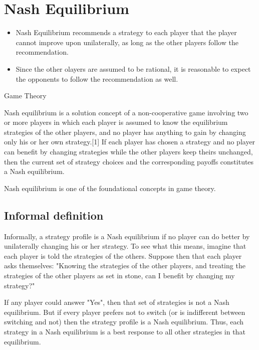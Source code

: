 \documentclass[a4paper,12pt]{article}
\begin{document}
\section{Nash Equilibrium}

\begin{framed}
\begin{itemize}
\item Nash Equilibrium recommends a strategy to each player that the player cannot improve upon unilaterally, as long as the other players follow the recommendation.
\item Since the other olayers are assumed to be rational, it is reasonable to expect the opponents to follow the recommendation as well.
\end{itemize}
\end{framed}
Game Theory


Nash equilibrium is a solution concept of a non-cooperative game involving two or more players in which each player is assumed to know the equilibrium strategies of the other players, and no player has anything to gain by changing only his or her own strategy.[1] If each player has chosen a strategy and no player can benefit by changing strategies while the other players keep theirs unchanged, then the current set of strategy choices and the corresponding payoffs constitutes a Nash equilibrium. 

Nash equilibrium is one of the foundational concepts in game theory.



\subsection{Informal definition}
Informally, a strategy profile is a Nash equilibrium if no player can do better by unilaterally changing his or her strategy. To see what this means, imagine that each player is told the strategies of the others. Suppose then that each player asks themselves: "Knowing the strategies of the other players, and treating the strategies of the other players as set in stone, can I benefit by changing my strategy?"

If any player could answer "Yes", then that set of strategies is not a Nash equilibrium. But if every player prefers not to switch (or is indifferent between switching and not) then the strategy profile is a Nash equilibrium. Thus, each strategy in a Nash equilibrium is a best response to all other strategies in that equilibrium.
\end{document}
